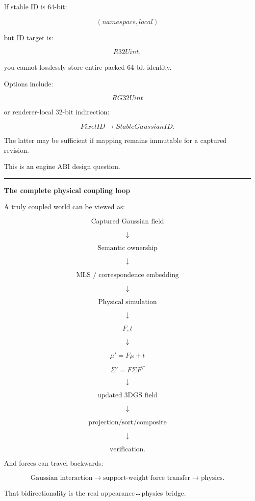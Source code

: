 If stable ID is 64-bit:

\[
(namespace,local)
\]

but ID target is:

\[
R32Uint,
\]

you cannot losslessly store entire packed 64-bit identity.

Options include:

\[
RG32Uint
\]

or renderer-local 32-bit indirection:

\[
PixelID
\rightarrow
StableGaussianID.
\]

The latter may be sufficient if mapping remains immutable for a captured revision.

This is an engine ABI design question.

\begin{center}\rule{0.5\linewidth}{0.5pt}\end{center}

\textbf{The complete physical coupling loop}

A truly coupled world can be viewed as:

\[
\text{Captured Gaussian field}
\]

\[
\downarrow
\]

\[
\text{Semantic ownership}
\]

\[
\downarrow
\]

\[
\text{MLS / correspondence embedding}
\]

\[
\downarrow
\]

\[
\text{Physical simulation}
\]

\[
\downarrow
\]

\[
F,t
\]

\[
\downarrow
\]

\[
\mu'=F\mu+t
\]

\[
\Sigma'=F\Sigma F^T
\]

\[
\downarrow
\]

\[
\text{updated 3DGS field}
\]

\[
\downarrow
\]

\[
\text{projection/sort/composite}
\]

\[
\downarrow
\]

\[
\text{verification}.
\]

And forces can travel backwards:

\[
\text{Gaussian interaction}
\rightarrow
\text{support-weight force transfer}
\rightarrow
\text{physics}.
\]

That bidirectionality is the real appearance↔physics bridge.

